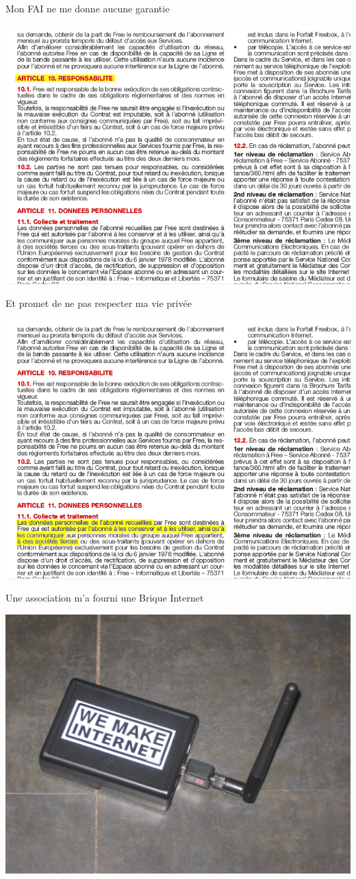 \documentclass[notes=hide]{beamer}
\begin{document}
\begin{frame}[t]{Mon FAI ne me donne aucune garantie}
\begin{center}
\vfill
\includegraphics[width=.75\textwidth]{img/03f-cgu.png}
\vfill
\end{center}
\end{frame}

\begin{frame}[t]{Et promet de ne pas respecter ma vie privée}
\begin{center}
\vfill
\includegraphics[width=.75\textwidth]{img/03g-cgu.png}
\vfill
\end{center}
\end{frame}

\begin{frame}[t]{Une association m'a fourni une Brique Internet}
\begin{center}
\vfill
\includegraphics[width=.75\textwidth]{img/04-photo-boitier.jpg}
\vfill
\end{center}
\end{frame}
\end{document}
